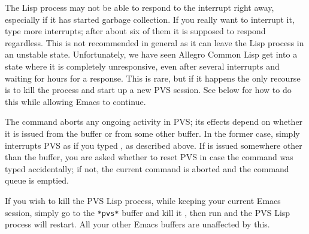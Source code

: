 The Lisp process may not be able to respond to the interrupt right away,
especially if it has started garbage collection.  If you really want to
interrupt it, type more  interrupts; after about six of them
it is supposed to respond regardless.  This is not recommended in general
as it can leave the Lisp process in an unstable state.  Unfortunately, we
have seen Allegro Common Lisp get into a state where it is completely
unresponsive, even after several interrupts and waiting for hours for a
response.  This is rare, but if it happens the only recourse is to kill
the process and start up a new PVS session.  See below for how to do this
while allowing Emacs to continue.

The  command aborts any ongoing activity in PVS; its
effects depend on whether it is issued from the  buffer or
from some other buffer.  In the former case,  simply
interrupts PVS as if you typed , as described above.  If
 is issued somewhere other than the  buffer,
you are asked whether to reset PVS in case the command was typed
accidentally; if not, the current command is aborted and the command queue
is emptied.

If you wish to kill the PVS Lisp process, while keeping your current Emacs
session, simply go to the \texttt{*pvs*} buffer and kill it
 , then run  and the PVS Lisp
process will restart.  All your other Emacs buffers are unaffected by
this.

